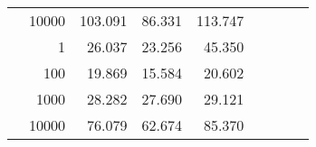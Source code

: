 \begin{table}
\begin{tabular}{rrrrrrrrr}
	            
					 &  
					 
					\multirow{ 1 }{*}{ 10000 } &
					
						
							    
							    
	                           103.091 & 86.331 & 113.747  \\
	                
	            
	        
				\noalign{\smallskip}\hline
				\multirow{ 4 }{*}{ 2000000 } &
				
					
					 
					\multirow{ 1 }{*}{ 1 } &
					
						
							    
							    
	                           26.037 & 23.256 & 45.350  \\
	                
	            
					 &  
					 
					\multirow{ 1 }{*}{ 100 } &
					
						
							    
							    
	                           19.869 & 15.584 & 20.602  \\
	                
	            
					 &  
					 
					\multirow{ 1 }{*}{ 1000 } &
					
						
							    
							    
	                           28.282 & 27.690 & 29.121  \\
	                
	            
					 &  
					 
					\multirow{ 1 }{*}{ 10000 } &
					
						
							    
							    
	                           76.079 & 62.674 & 85.370  \\
	                
	            
	        

\hline

\end{tabular}
\end{table}
\clearpage


	    
	
	    

